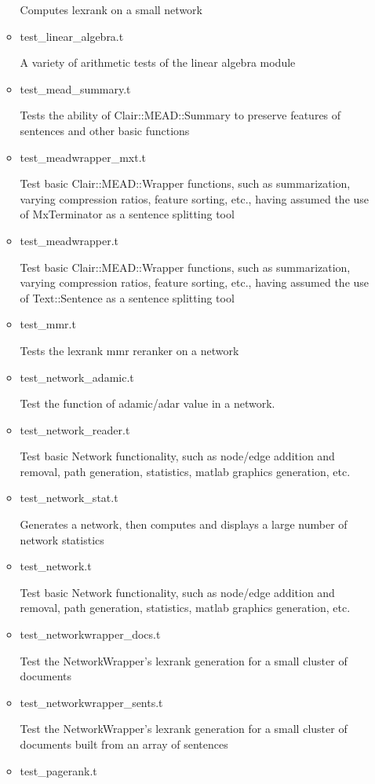 \begin{itemize}
\begin{itemize}
 Computes lexrank on a small network 
  \item test\_linear\_algebra.t

 A variety of arithmetic tests of the linear algebra module 
  \item test\_mead\_summary.t

 Tests the ability of Clair::MEAD::Summary to preserve
 features of sentences and other basic functions 
  \item test\_meadwrapper\_mxt.t

 Test basic Clair::MEAD::Wrapper functions, such as
 summarization, varying compression ratios, feature sorting,
 etc., having assumed the use of MxTerminator as a sentence
 splitting tool 
  \item test\_meadwrapper.t

 Test basic Clair::MEAD::Wrapper functions, such as
 summarization, varying compression ratios, feature sorting,
 etc., having assumed the use of Text::Sentence as a sentence
 splitting tool 
  \item test\_mmr.t

 Tests the lexrank mmr reranker on a network   
  \item test\_network\_adamic.t

 Test the function of adamic/adar value in a network.
  \item test\_network\_reader.t

 Test basic Network functionality, such as node/edge addition
 and removal, path generation, statistics, matlab graphics
 generation, etc.
  \item test\_network\_stat.t

 Generates a network, then computes and displays a large          
 number of network statistics 
  \item test\_network.t

 Test basic Network functionality, such as node/edge addition
 and removal, path generation, statistics, matlab graphics
 generation, etc. 
  \item test\_networkwrapper\_docs.t

 Test the NetworkWrapper's lexrank generation for a small
 cluster of documents 
  \item test\_networkwrapper\_sents.t

 Test the NetworkWrapper's lexrank generation for a small        
 cluster of documents built from an array of sentences 
  \item test\_pagerank.t


\end{itemize}
\end{itemize}

